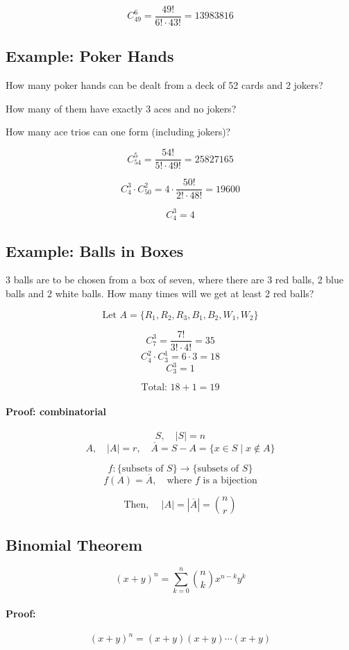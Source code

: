 \documentclass[11pt]{article}
\begin{document}
\[
C_{49}^6 = \frac{49!}{6! \cdot 43!} = 13983816
\]

\subsection*{Example: Poker Hands}
How many poker hands can be dealt from a deck of 52 cards and 2 jokers?

How many of them have exactly 3 aces and no jokers?

How many ace trios can one form (including jokers)?

\[
C_{54}^5 = \frac{54!}{5! \cdot 49!} = 25827165
\]

\[
C_{4}^3 \cdot C_{50}^2 = 4 \cdot \frac{50!}{2! \cdot 48!} = 19600
\]

\[
C_{4}^3 = 4
\]

\subsection*{Example: Balls in Boxes}
3 balls are to be chosen from a box of seven, where there are 3 red balls, 2 blue balls and 2 white balls. How many times will we get at least 2 red balls?

\[
\text{Let } A = \{R_1, R_2, R_3, B_1, B_2, W_1, W_2\}
\]

\[
C_7^3 = \frac{7!}{3! \cdot 4!} = 35
\]
\[
C_4^2 \cdot C_3^1 = 6 \cdot 3 = 18
\]
\[
C_3^3 = 1
\]

\[
\text{Total: } 18 + 1 = 19
\]

\paragraph{Proof: combinatorial}
\[
S, \quad |S| = n
\]
\[
A, \quad |A| = r, \quad \overline{A} = S - A = \{x \in S \mid x \notin A\}
\]

\[
f : \{ \text{subsets of } S\} \rightarrow \{ \text{subsets of } S\}
\]
\[
f(A) = \overline{A}, \quad \text{where } f \text{ is a bijection}
\]

\[
\text{Then, } \quad |A| = |\overline{A}| = \binom{n}{r}
\]

\subsection{Binomial Theorem}
\[
(x + y)^n = \sum_{k=0}^{n} \binom{n}{k} x^{n-k} y^k
\]

\paragraph{Proof:}
\[
(x + y)^n = (x + y)(x + y) \cdots (x + y)
\]
\end{document}
